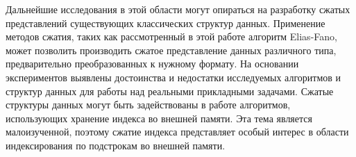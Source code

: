 Дальнейшие исследования в этой области могут опираться на разработку сжатых представлений существующих
классических структур данных. Применение методов сжатия,
таких как рассмотренный в этой работе алгоритм Elias-Fano, может позволить производить сжатое представление
данных различного типа, предварительно преобразованных к нужному формату.
На основании экспериментов выявлены достоинства и недостатки исследуемых алгоритмов и структур данных
для работы над реальными прикладными задачами.
Сжатые структуры данных могут быть задействованы в работе алгоритмов,
использующих хранение индекса во внешней памяти. Эта тема является малоизученной, поэтому
сжатие индекса представляет особый интерес в области индексирования по подстрокам во внешней памяти.

